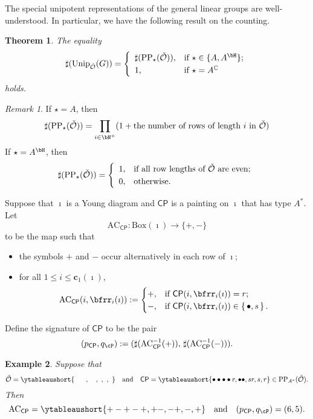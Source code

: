 \documentclass[12pt,a4paper]{amsart}
\let\ytb=\ytableaushort
\newcommand{\CO}{{\mathcal {O}}}
\newcommand{\CP}{{\mathcal {P}}}
\numberwithin{equation}{section}
\newtheorem{thm}{Theorem}[section]
\newtheorem{eg}[thm]{Example}
\theoremstyle{remark}
\newtheorem*{remark}{Remark}
\def\Unip{\mathrm{Unip}}
\def\CP{\mathsf{CP}}
\begin{document}
 
 The special unipotent representations of the general linear groups are well-understood. In particular, we have the following result on the counting. 
\begin{thm}
The equality 
\[
\sharp(\Unip_{\check \CO}(G))= \left\{
     \begin{array}{ll}
        \sharp(\mathrm{PP}_\star(\check \CO)), &\hbox{if $\star\in\{A, A^\bH\}$}; \smallskip\\
           1, &\hbox{if $\star=A^\C$}  \end{array}
   \right.
\]
holds. 

\end{thm}
\begin{remark}
If $\star=A$, then  
\[
\sharp(\mathrm{PP}_\star(\check \CO))=\prod_{i\in \bN^+} (1+\textrm{the number of rows of length $i$ in $\check \CO$})
\]
If 
 $\star=A^\bH$, then  
\[
\sharp(\mathrm{PP}_\star(\check \CO))= \left\{
     \begin{array}{ll}
        1, &\hbox{if all row lengths of $\check \CO$ are even}; \smallskip\\
           0, &\hbox{otherwise}.  \end{array}
   \right.
\]

\end{remark}

Suppose that $\imath$ is a Young diagram and $\CP$ is a painting on  $\imath$ that has type $A^*$. Let $$\mathrm{AC}_\CP: \mathrm{Box}(\imath)\rightarrow \{+, -\}$$ to be the map such that 
  \begin{itemize}
    \item the symbols $+$ and $-$ occur alternatively in each row of $\imath$;
    \item for all $1\leq i\leq \mathbf c_1(\imath) $, 
    \[
       \mathrm{AC}_\CP (i,\bfrr_i(\imath)) := \begin{cases}
    +,  & \text{if  }\CP(i,\bfrr_i(\imath))=r;\\
    -,  & \text{if } \CP(i,\bfrr_i(\imath))\in \set{\bullet,s}.
  \end{cases}
    \]
  \end{itemize}
Define the signature of $\CP$ to be the pair
\[
  (p_\CP, q_\cP):=(\sharp( \mathrm{AC}_\CP^{-1}(+)),\, \sharp( \mathrm{AC}_\CP^{-1}(-))). 
\]

\begin{eg}
 Suppose that \[
\check \CO=\ytb{\ \ \ \ \ , \ \ \ , \ , \ , \   }\quad \textrm{and}\quad  \CP=\ytb{\bullet\bullet\bullet\bullet r,\bullet\bullet , sr,s,r}\in \mathrm{PP}_{A^*}(\check \CO) . 
 \]
 Then
 \[
  \mathrm{AC}_\CP=
 \ytb{+-+-+,+-, -+,-,+}\quad \textrm{and}  \quad  (p_\CP, q_\cP)=(6,5). 
  \]
\end{eg}
\end{document}
